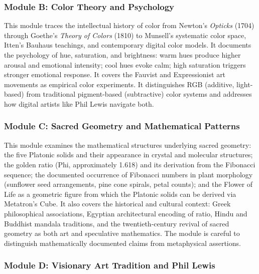 \documentclass[11pt,letterpaper]{article}
\begin{document}
\subsubsection{Module B: Color Theory and Psychology}

This module traces the intellectual history of color from Newton's \textit{Opticks} (1704) through Goethe's \textit{Theory of Colors} (1810) to Munsell's systematic color space, Itten's Bauhaus teachings, and contemporary digital color models. It documents the psychology of hue, saturation, and brightness: warm hues produce higher arousal and emotional intensity; cool hues evoke calm; high saturation triggers stronger emotional response. It covers the Fauvist and Expressionist art movements as empirical color experiments. It distinguishes RGB (additive, light-based) from traditional pigment-based (subtractive) color systems and addresses how digital artists like Phil Lewis navigate both.

\subsubsection{Module C: Sacred Geometry and Mathematical Patterns}

This module examines the mathematical structures underlying sacred geometry: the five Platonic solids and their appearance in crystal and molecular structures; the golden ratio (Phi, approximately 1.618) and its derivation from the Fibonacci sequence; the documented occurrence of Fibonacci numbers in plant morphology (sunflower seed arrangements, pine cone spirals, petal counts); and the Flower of Life as a geometric figure from which the Platonic solids can be derived via Metatron's Cube. It also covers the historical and cultural context: Greek philosophical associations, Egyptian architectural encoding of ratio, Hindu and Buddhist mandala traditions, and the twentieth-century revival of sacred geometry as both art and speculative mathematics. The module is careful to distinguish mathematically documented claims from metaphysical assertions.

\subsubsection{Module D: Visionary Art Tradition and Phil Lewis}
\end{document}
